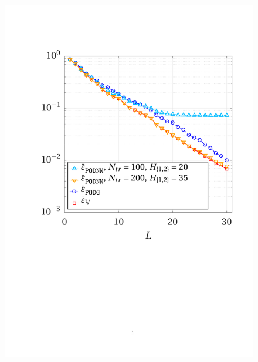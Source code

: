 \documentclass{elsarticle}
\numberwithin{equation}{section}
\theoremstyle{theorem}
\theoremstyle{definition}
\theoremstyle{remark}
\theoremstyle{proposition}
\numberwithin{figure}{section}
\begin{document}
		\begin{figure}[t!]
			\center
			\includegraphics[scale = 0.395, trim = {1.5cm 9.6cm 1.5cm 3.8cm}, clip]{poisson2d_3_error_vs_rank_bis}
			\hspace*{0.8cm}

\end{figure}
\end{document}
